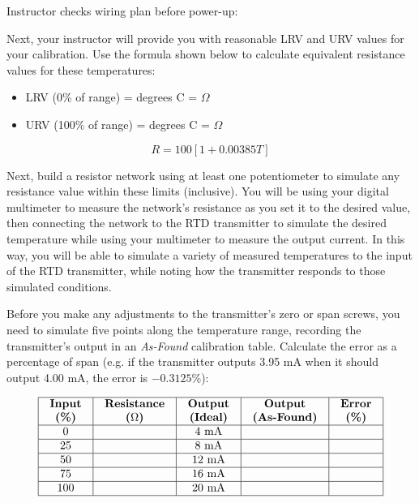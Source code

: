 \vskip 10pt

Instructor checks wiring plan before power-up: \underbar{\hskip 20pt}

\vskip 20pt

Next, your instructor will provide you with reasonable LRV and URV values for your calibration.  Use the formula shown below to calculate equivalent resistance values for these temperatures:

\begin{itemize}
\item{} LRV (0\% of range) = \underbar{\hskip 50pt} degrees C = \underbar{\hskip 50pt} $\Omega$
\vskip 10pt
\item{} URV (100\% of range) = \underbar{\hskip 50pt} degrees C = \underbar{\hskip 50pt} $\Omega$
\end{itemize}

$$R = 100 [ 1 + 0.00385 T ]$$

\vfil \eject

Next, build a resistor network using at least one potentiometer to simulate any resistance value within these limits (inclusive).  You will be using your digital multimeter to measure the network's resistance as you set it to the desired value, then connecting the network to the RTD transmitter to simulate the desired temperature while using your multimeter to measure the output current.  In this way, you will be able to simulate a variety of measured temperatures to the input of the RTD transmitter, while noting how the transmitter responds to those simulated conditions.

\vskip 10pt

\filbreak

Before you make any adjustments to the transmitter's zero or span screws, you need to simulate five points along the temperature range, recording the transmitter's output in an {\it As-Found} calibration table.  Calculate the error as a percentage of span (e.g. if the transmitter outputs 3.95 mA when it should output 4.00 mA, the error is $-0.3125$\%):


$$\vbox{\offinterlineskip
\halign{\strut
\vrule \quad\hfil # \ \hfil & 
\vrule \quad\hfil # \ \hfil & 
\vrule \quad\hfil # \ \hfil & 
\vrule \quad\hfil # \ \hfil & 
\vrule \quad\hfil # \ \hfil \vrule \cr
\noalign{\hrule}
%
{\bf Input} & {\bf Resistance} & {\bf Output} & {\bf Output} & {\bf Error} \cr
{\bf (\%)} & {\bf ($\Omega$)} & {\bf (Ideal)} & {\bf (As-Found)} & {\bf (\%)} \cr 
%
\noalign{\hrule}
%
0 & & 4 mA & &  \cr
%
\noalign{\hrule}
%
25 & & 8 mA & &  \cr
%
\noalign{\hrule}
%
50 & & 12 mA & &  \cr
%
\noalign{\hrule}
%
75 & & 16 mA & &  \cr
%
\noalign{\hrule}
%
100 & & 20 mA & &  \cr
%
\noalign{\hrule}
} %
}$$ %

